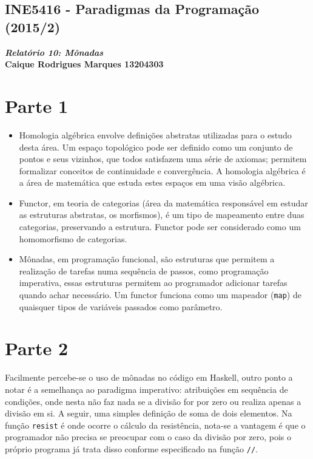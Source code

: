 \documentclass{article}
\begin{document}
    \begin{center}
        \section*{INE5416 - Paradigmas da Programação (2015/2)}
        \textbf{\textit{Relatório 10: Mônadas} \\
        Caique Rodrigues Marques 13204303}
    \end{center}
    
    \section*{Parte 1}
        \begin{itemize}
            \item Homologia algébrica envolve definições abstratas utilizadas para o estudo desta área. Um
            espaço topológico pode ser definido como um conjunto de pontos e seus vizinhos, que todos
            satisfazem uma série de axiomas; permitem formalizar conceitos de continuidade e convergência. A
            homologia algébrica é a área de matemática que estuda estes espaços em uma visão algébrica.

            \item Functor, em teoria de categorias (área da matemática responsável em estudar as estruturas
            abstratas, os morfismos), é um tipo de mapeamento entre duas categorias, preservando a estrutura.
            Functor pode ser considerado como um homomorfismo de categorias.

            \item Mônadas, em programação funcional, são estruturas que permitem a realização de tarefas numa
            sequência de passos, como programação imperativa, essas estruturas permitem ao programador
            adicionar tarefas quando achar necessário. Um functor funciona como um mapeador (\texttt{map}) de
            quaisquer tipos de variáveis passados como parâmetro.
        \end{itemize}
        
    \section*{Parte 2}
        Facilmente percebe-se o uso de mônadas no código em Haskell, outro ponto a notar é a semelhança ao
        paradigma imperativo: atribuições em sequência de condições, onde nesta não faz nada se a divisão for
        por zero ou realiza apenas a divisão em si. A seguir, uma simples definição de soma de dois
        elementos. Na função \texttt{resist} é onde ocorre o cálculo da resistência, nota-se a vantagem é que
        o programador não precisa se preocupar com o caso da divisão por zero, pois o próprio programa já
        trata disso conforme especificado na função \texttt{//}.
\end{document}

